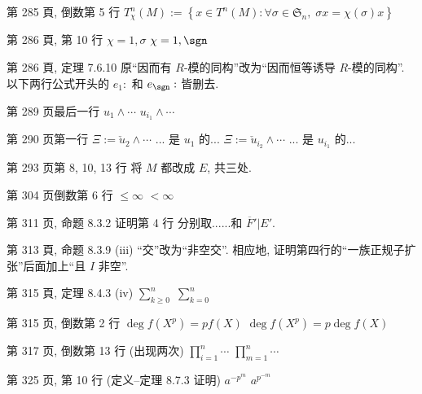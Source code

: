 \documentclass{AJerrata}
\begin{document}
\begin{Errata}
		\item[第 285 頁, 倒数第 5 行]
		$T_\chi^n(M) := \left\{ x \in T^n(M) : \forall \sigma \in \mathfrak{S}_n, \; \sigma x = \chi(\sigma) x \right\}$

		\item[第 286 頁, 第 10 行]
		\Orig $\chi = 1, \sigma$
		\Corr $\chi = 1, \sgn$
		
		\item[第 286 頁, 定理 7.6.10]
		原``因而有 $R$-模的同构''改为``因而恒等诱导 $R$-模的同构''. 以下两行公式开头的 $e_1:$ 和 $e_{\sgn}: $ 皆删去.
		
		\item[第 289 页最后一行]
		\Orig $u_1 \wedge \cdots$
		\Corr $u_{i_1} \wedge \cdots$
		
		\item[第 290 页第一行]
		\Orig $\Xi := \check{u}_2 \wedge \cdots$ ... 是 $u_1$ 的...
		\Corr $\Xi := \check{u}_{i_2} \wedge \cdots$ ... 是 $u_{i_1}$ 的...
		
		\item[第 293 页第 8, 10, 13 行]
		将 $M$ 都改成 $E$, 共三处.
		
		\item[第 304 页倒数第 6 行]
		\Orig $\leq \infty$
		\Corr $< \infty$
        
        \item[第 311 页, 命题 8.3.2 证明第 4 行]
        \Corr 分别取......和 $\overline{F}' | E'$.
        
  		\item[第 313 頁, 命题 8.3.9 (iii)]
  		``交''改为``非空交''. 相应地, 证明第四行的``一族正规子扩张''后面加上``且 $I$ 非空''.
        
   		\item[第 315 頁, 定理 8.4.3 (iv)]
        \Orig $\sum_{k \geq 0}^n$
        \Corr $\sum_{k=0}^n$

        \item[第 315 页, 倒数第 2 行]
        \Orig $\deg f(X^p) = pf(X)$
        \Corr $\deg f(X^p) = p \deg f(X)$
        
        \item[第 317 页, 倒数第 13 行]
        (出现两次)\;
        \Orig $\prod_{i=1}^n \cdots$
        \Corr $\prod_{m=1}^n \cdots$
        
        \item[第 325 页, 第 10 行 (定义--定理 8.7.3 证明)]
        \Orig $a^{-p^m}$
        \Corr $a^{p^{-m}}$
        

\end{Errata}
\end{document}
